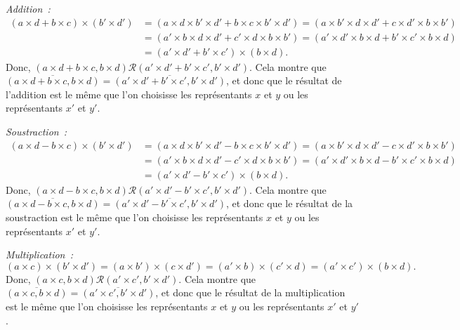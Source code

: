 \noindent\emph{Addition :}
    \begin{equation*}
        \begin{aligned}
            (a \times d + b \times c) \times (b' \times d')
            & = (a \times d \times b' \times d' + b \times c \times b' \times d')
            = (a \times b' \times d \times d' + c \times d' \times b \times b') \\
            & {} = (a' \times b \times d \times d' + c' \times d \times b \times b') 
            = (a' \times d' \times b \times d + b' \times c' \times b \times d) \\
            & {} = (a' \times d' + b' \times c') \times (b \times d) .
        \end{aligned}
    \end{equation*}
    Donc, $(a \times d + b \times c, b \times d) \mathrel{\mathcal{R}} (a' \times d' + b' \times c', b' \times d')$. 
    Cela montre que $\overline{(a \times d + b \times c, b \times d)} = \overline{(a' \times d' + b' \times c', b' \times d')}$, et donc que le résultat de l'addition est le même que l'on choisisse les représentants $x$ et $y$ ou les représentants $x'$ et $y'$.

\noindent\emph{Soustraction :}
    \begin{equation*}
        \begin{aligned}
            (a \times d - b \times c) \times (b' \times d')
            & = (a \times d \times b' \times d' - b \times c \times b' \times d')
            = (a \times b' \times d \times d' - c \times d' \times b \times b') \\
            & {} = (a' \times b \times d \times d' - c' \times d \times b \times b') 
            = (a' \times d' \times b \times d - b' \times c' \times b \times d) \\
            & {} = (a' \times d' - b' \times c') \times (b \times d) .
        \end{aligned}
    \end{equation*}
    Donc, $(a \times d - b \times c, b \times d) \mathrel{\mathcal{R}} (a' \times d' - b' \times c', b' \times d')$. 
    Cela montre que $\overline{(a \times d - b \times c, b \times d)} = \overline{(a' \times d' - b' \times c', b' \times d')}$, et donc que le résultat de la soustraction est le même que l'on choisisse les représentants $x$ et $y$ ou les représentants $x'$ et $y'$.

\noindent\emph{Multiplication :}
    \begin{equation*}
        (a \times c) \times (b' \times d')
        = (a \times b') \times (c \times d')
        = (a' \times b) \times (c' \times d)
        = (a' \times c') \times (b \times d) .
    \end{equation*}
    Donc, $(a \times c, b \times d) \mathrel{\mathcal{R}} (a' \times c', b' \times d')$. 
    Cela montre que $\overline{(a \times c, b \times d)} = \overline{(a' \times c', b' \times d')}$, et donc que le résultat de la multiplication est le même que l'on choisisse les représentants $x$ et $y$ ou les représentants $x'$ et $y'$.

